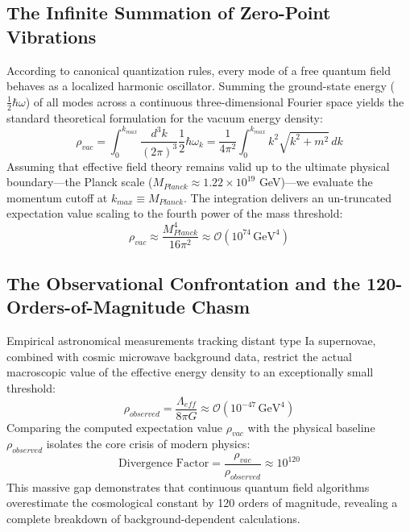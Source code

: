 \documentclass[11pt,a4paper]{article}
\theoremstyle{plain}
\theoremstyle{definition}
\begin{document}
\subsection{The Infinite Summation of Zero-Point Vibrations}
According to canonical quantization rules, every mode of a free quantum field behaves as a localized harmonic oscillator. Summing the ground-state energy ($\frac{1}{2}\hbar\omega$) of all modes across a continuous three-dimensional Fourier space yields the standard theoretical formulation for the vacuum energy density:
\begin{equation}
\rho_{vac} = \int_{0}^{k_{max}} \frac{d^3k}{(2\pi)^3} \frac{1}{2}\hbar\omega_k = \frac{1}{4\pi^2} \int_{0}^{k_{max}} k^2 \sqrt{k^2 + m^2} \, dk
\end{equation}
Assuming that effective field theory remains valid up to the ultimate physical boundary—the Planck scale ($M_{Planck} \approx 1.22 \times 10^{19}$ GeV)—we evaluate the momentum cutoff at $k_{max} \equiv M_{Planck}$. The integration delivers an un-truncated expectation value scaling to the fourth power of the mass threshold:
\begin{equation}
\rho_{vac} \approx \frac{M_{Planck}^4}{16\pi^2} \approx \mathcal{O}(10^{74} \, \text{GeV}^4)
\end{equation}

\subsection{The Observational Confrontation and the 120-Orders-of-Magnitude Chasm}
Empirical astronomical measurements tracking distant type Ia supernovae, combined with cosmic microwave background data, restrict the actual macroscopic value of the effective energy density to an exceptionally small threshold:
\begin{equation}
\rho_{observed} = \frac{\Lambda_{eff}}{8\pi G} \approx \mathcal{O}(10^{-47} \, \text{GeV}^4)
\end{equation}
Comparing the computed expectation value $\rho_{vac}$ with the physical baseline $\rho_{observed}$ isolates the core crisis of modern physics:
\begin{equation}
\text{Divergence Factor} = \frac{\rho_{vac}}{\rho_{observed}} \approx 10^{120}
\end{equation}
This massive gap demonstrates that continuous quantum field algorithms overestimate the cosmological constant by 120 orders of magnitude, revealing a complete breakdown of background-dependent calculations.
\end{document}
